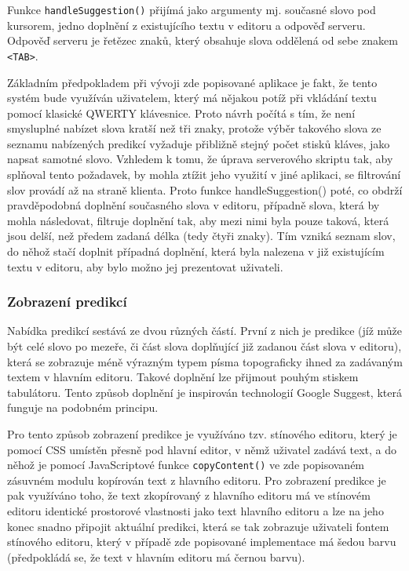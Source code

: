 \documentclass[a4paper,11pt]{article}
\begin{document}
Funkce {\tt handleSuggestion()} přijímá jako argumenty mj. současné slovo pod kursorem, jedno doplnění z existujícího textu v editoru a odpověď serveru. Odpověď serveru je řetězec znaků, který obsahuje slova oddělená od sebe znakem {\tt <TAB>}. 

Základním předpokladem při vývoji zde popisované aplikace je fakt, že tento systém bude využíván uživatelem, který má nějakou potíž při vkládání textu pomocí klasické QWERTY klávesnice. Proto návrh počítá s tím, že není smysluplné nabízet slova kratší než tři znaky, protože výběr takového slova ze seznamu nabízených predikcí vyžaduje přibližně stejný počet stisků kláves, jako napsat samotné slovo. Vzhledem k tomu, že úprava serverového skriptu tak, aby splňoval tento požadavek, by mohla ztížit jeho využití v jiné aplikaci, se filtrování slov provádí až na straně klienta. Proto funkce handleSuggestion() poté, co obdrží pravděpodobná doplnění současného slova v editoru, případně slova, která by mohla následovat, filtruje doplnění tak, aby mezi nimi byla pouze taková, která jsou delší, než předem zadaná délka (tedy čtyři znaky). Tím vzniká seznam slov, do něhož stačí doplnit případná doplnění, která byla nalezena v již existujícím textu v editoru, aby bylo možno jej prezentovat uživateli.

\subsubsection{Zobrazení predikcí}

Nabídka predikcí sestává ze dvou různých částí. První z nich je predikce (jíž může být celé slovo po mezeře, či část slova doplňující již zadanou část slova v editoru), která se zobrazuje méně výrazným typem písma topograficky ihned za zadávaným textem v hlavním editoru. Takové doplnění lze přijmout pouhým stiskem tabulátoru. Tento způsob doplnění je inspirován technologií Google Suggest, která funguje na podobném principu. 

Pro tento způsob zobrazení predikce je využíváno tzv. stínového editoru, který je pomocí CSS umístěn přesně pod hlavní editor, v němž uživatel zadává text, a do něhož je pomocí JavaScriptové funkce {\tt copyContent()} ve zde popisovaném zásuvném modulu kopírován text z hlavního editoru. Pro zobrazení predikce je pak využíváno toho, že text zkopírovaný z hlavního editoru má ve stínovém editoru identické prostorové vlastnosti jako text hlavního editoru a lze na jeho konec snadno připojit aktuální predikci, která se tak zobrazuje uživateli fontem stínového editoru, který v případě zde popisované implementace má šedou barvu (předpokládá se, že text v hlavním editoru má černou barvu). 
\end{document}
